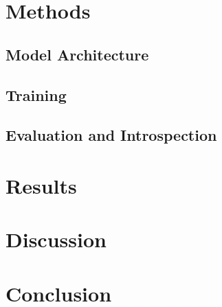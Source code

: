 \documentclass[conference]{IEEEtran}
\begin{document}
\section{Methods}


\subsection{Model Architecture}


\subsection{Training}


\subsection{Evaluation and Introspection}


\section{Results}


\section{Discussion}


\section{Conclusion}


\break{}

\end{document}
